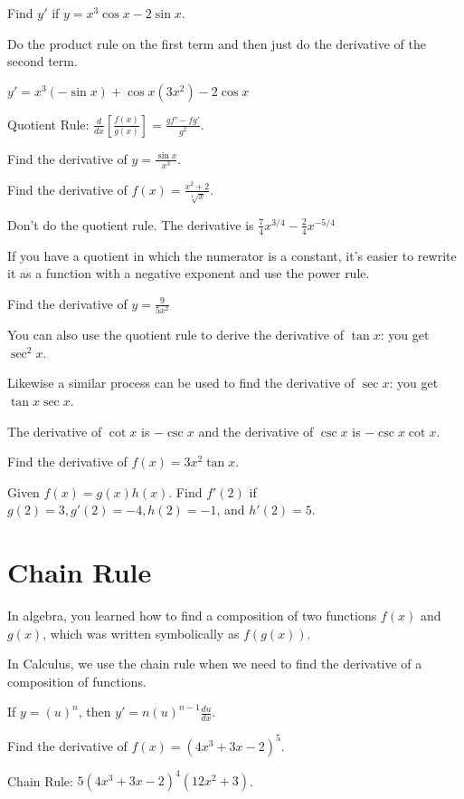 \documentclass[../bccalc.tex]{subfiles}
\begin{document}
\begin{example}
    Find $y'$ if $y=x^3\cos x-2\sin x$.

    Do the product rule on the first term and then just do the derivative of the second term.

    $y'=x^3(-\sin x)+\cos x(3x^2)-2\cos x$
\end{example}

Quotient Rule: $\frac{d}{dx}\left[\frac{f(x)}{g(x)}\right] = \frac{gf'-fg'}{g^2}$.

\ex Find the derivative of $y=\frac{\sin x}{x^3}$.

\begin{example}
    Find the derivative of $f(x)=\frac{x^2+2}{\sqrt[4]{x}}$.

    Don't do the quotient rule. The derivative is $\frac{7}{4}x^{3/4}-\frac{2}{4}x^{-5/4}$
\end{example}

If you have a quotient in which the numerator is a constant, it's easier to rewrite it as a function with a negative exponent and use the power rule.

\ex Find the derivative of $y=\frac{9}{5x^2}$

You can also use the quotient rule to derive the derivative of $\tan x$: you get $\sec^2 x$.

Likewise a similar process can be used to find the derivative of $\sec x$: you get $\tan x\sec x$.

The derivative of $\cot x$ is $-\csc x$ and the derivative of $\csc x$ is $-\csc x\cot x$.

\ex Find the derivative of $f(x)=3x^2\tan x$.

\ex Given $f(x)=g(x)h(x)$. Find $f'(2)$ if $g(2)=3, g'(2)=-4, h(2)=-1$, and $h'(2)=5$.

\pagebreak
\section{Chain Rule}
In algebra, you learned how to find a composition of two functions $f(x)$ and $g(x)$, which was written symbolically as $f(g(x))$.

In Calculus, we use the chain rule when we need to find the derivative of a composition of functions.

If $y=(u)^n$, then $y'=n(u)^{n-1}\frac{du}{dx}$.

\begin{example}
    Find the derivative of $f(x)=(4x^3+3x-2)^5$.

    Chain Rule: $5(4x^3+3x-2)^4(12x^2+3)$.
\end{example}
\end{document}
